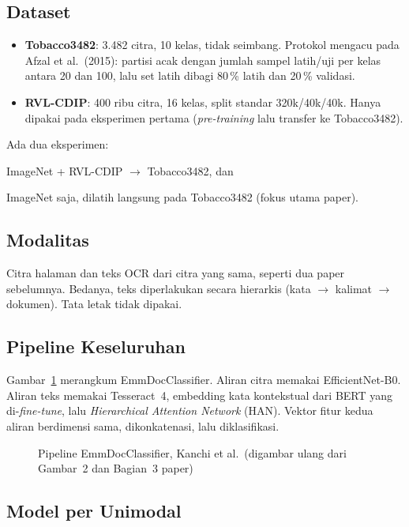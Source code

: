 \subsection{Dataset}
\begin{itemize}
  \item \textbf{Tobacco3482}: 3.482 citra, 10 kelas, tidak seimbang. Protokol mengacu pada
        Afzal et al.\ (2015): partisi acak dengan jumlah sampel latih/uji per kelas antara
        20 dan 100, lalu set latih dibagi 80\,\% latih dan 20\,\% validasi.
  \item \textbf{RVL-CDIP}: 400 ribu citra, 16 kelas, split standar 320k/40k/40k. Hanya
        dipakai pada eksperimen pertama (\emph{pre-training} lalu transfer ke Tobacco3482).
\end{itemize}
Ada dua eksperimen:
\begin{enumerate*}[label=(\alph*)]
  \item ImageNet + RVL-CDIP $\to$ Tobacco3482, dan
  \item ImageNet saja, dilatih langsung pada Tobacco3482 (fokus utama paper).
\end{enumerate*}

\subsection{Modalitas}
Citra halaman dan teks OCR dari citra yang sama, seperti dua paper sebelumnya. Bedanya,
teks diperlakukan secara hierarkis (kata $\to$ kalimat $\to$ dokumen). Tata letak tidak
dipakai.

\subsection{Pipeline Keseluruhan}
Gambar~\ref{fig:pipeline-kanchi} merangkum EmmDocClassifier. Aliran citra memakai
EfficientNet-B0. Aliran teks memakai Tesseract~4, embedding kata kontekstual dari BERT yang
di-\emph{fine-tune}, lalu \emph{Hierarchical Attention Network} (HAN). Vektor fitur kedua
aliran berdimensi sama, dikonkatenasi, lalu diklasifikasi.

\begin{figure}[H]
  \centering
  
  \caption{Pipeline EmmDocClassifier, Kanchi et al.\ (digambar ulang dari Gambar~2 dan Bagian~3 paper)}
  \label{fig:pipeline-kanchi}
\end{figure}

\subsection{Model per Unimodal}
